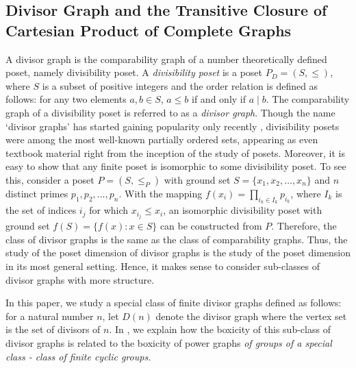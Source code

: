 \documentclass[twoside, 11pt]{article}
\newcommand{\G}{\Gamma}
\begin{document}
\subsection{Divisor Graph and the Transitive Closure of Cartesian Product of Complete Graphs}\label{sec: divisor graphs}

A divisor graph is the comparability graph of a number theoretically defined poset, namely divisibility poset. A \textit{divisibility poset} is a poset $P_D=(S,\leq)$, where $S$ is a subset of positive integers and the order relation is defined as follows: for any two elements $a,b \in S$, $a \leq b$ if and only if $a \mid b$. The comparability graph of a divisibility poset is referred to as a \textit{divisor graph}. Though the name  `divisor graphs' has started gaining popularity only recently  \cite{santhosh1828divisor}, divisibility posets were among the most well-known partially ordered sets, appearing as even textbook material right from the inception of the study of posets. Moreover, it is easy to show that any finite poset is isomorphic to some divisibility poset. To see this, consider a poset $P=(S,\leq_P)$ with ground set $S=\{x_1,x_2,\dots,x_n\}$ and $n$ distinct primes $p_1,p_2,\dots, p_n$. With the mapping $f(x_i)={ \prod_{i_k \in I_k} p_{i_k}}$, where $I_k$ is the set of indices $i_j$ for which $x_{i_j} \leq x_i$, an isomorphic divisibility poset with ground set $f(S) = \{ f(x) : x \in S\}$  can be constructed from $P$. Therefore, the class of divisor graphs is the same as the class of comparability graphs. Thus, the study of the poset dimension of divisor graphs is the study of the poset dimension in its most general setting. Hence, it makes sense to
consider sub-classes of divisor graphs with more structure. 

In this paper, we study a special class of finite divisor graphs defined as follows: for a natural number $n$, let $D(n)$ denote the divisor graph where the vertex set is the set of divisors of $n$.  In , we explain how the boxicity of this sub-class of divisor graphs is related to the boxicity of power graphs \textit{of groups of a special class - class of finite cyclic groups.} %
\end{document}
